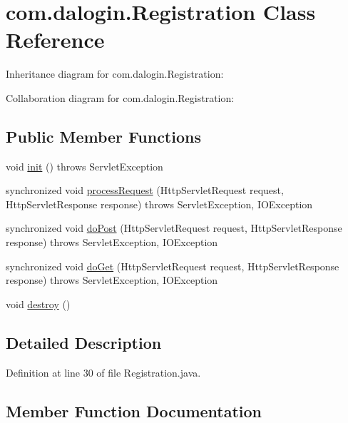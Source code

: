 \hypertarget{classcom_1_1dalogin_1_1_registration}{}\section{com.\+dalogin.\+Registration Class Reference}
\label{classcom_1_1dalogin_1_1_registration}


Inheritance diagram for com.\+dalogin.\+Registration\+:


Collaboration diagram for com.\+dalogin.\+Registration\+:
\subsection*{Public Member Functions}
\begin{DoxyCompactItemize}
\item 
void \hyperlink{classcom_1_1dalogin_1_1_registration_a683507400fa150d8e73af073b2659498}{init} ()  throws Servlet\+Exception     
\item 
synchronized void \hyperlink{classcom_1_1dalogin_1_1_registration_a769270d44c89eac47ace2b545f1dd283}{process\+Request} (Http\+Servlet\+Request request, Http\+Servlet\+Response response)  throws Servlet\+Exception, I\+O\+Exception 
\item 
synchronized void \hyperlink{classcom_1_1dalogin_1_1_registration_a148bd08226082d310ac19c2a03607408}{do\+Post} (Http\+Servlet\+Request request, Http\+Servlet\+Response response)  throws Servlet\+Exception, I\+O\+Exception     
\item 
synchronized void \hyperlink{classcom_1_1dalogin_1_1_registration_ac8e25f85ec127e49f142e8694729a932}{do\+Get} (Http\+Servlet\+Request request, Http\+Servlet\+Response response)  throws Servlet\+Exception, I\+O\+Exception     
\item 
void \hyperlink{classcom_1_1dalogin_1_1_registration_adf8d467c0af768cc6d8abc351f1e94a9}{destroy} ()
\end{DoxyCompactItemize}


\subsection{Detailed Description}


Definition at line 30 of file Registration.\+java.



\subsection{Member Function Documentation}
\mbox{\label{classcom_1_1dalogin_1_1_registration_adf8d467c0af768cc6d8abc351f1e94a9}} 
